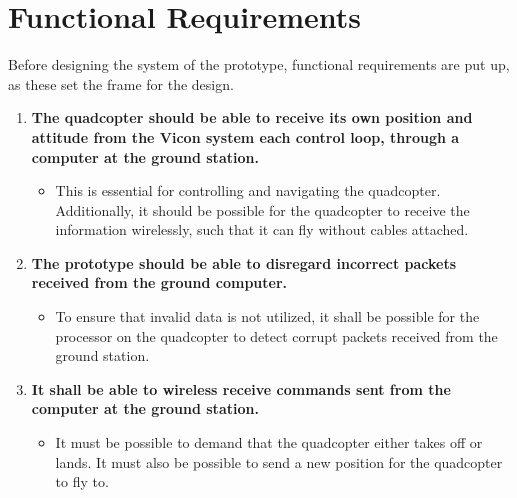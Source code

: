 \chapter{Functional Requirements}
\label{ch:functionalRequirements}
Before designing the system of the prototype, functional requirements are put up, as these set the frame for the design.  

\begin{enumerate}[label=\textbf{\arabic*})]


\item \textbf{The quadcopter should be able to receive its own position and attitude from the Vicon system each control loop, through a computer at the ground station.}
\begin{itemize}
\item[] %
This is essential for controlling and navigating the quadcopter. Additionally, it should be possible for the quadcopter to receive the information wirelessly, such that it can fly without cables attached.%
\end{itemize}

\item \textbf{The prototype should be able to disregard incorrect packets received from the ground computer.}
\begin{itemize}
\item[] To ensure that invalid data is not utilized, it shall be possible for the processor on the quadcopter to detect corrupt packets received from the ground station.
\end{itemize}


\item \textbf{It shall be able to wireless receive commands sent from the computer at the ground station.}
\begin{itemize}
\item[] It must be possible to demand that the quadcopter either takes off or lands. It must also be possible to send a new position for the quadcopter to fly to.  
\end{itemize}



\end{enumerate}
